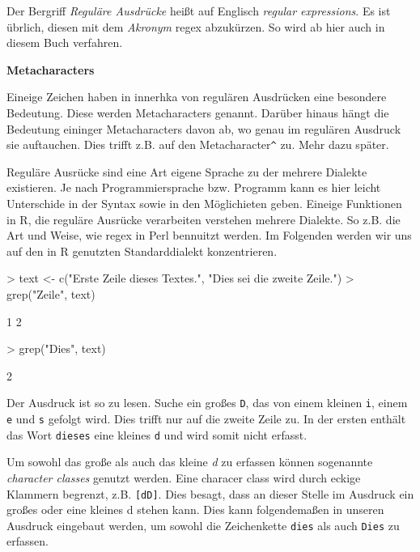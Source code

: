 \documentclass[a4paper]{report}
\newcommand{\R}{{\sffamily R}}
\begin{document}
Der Bergriff \emph{Reguläre Ausdrücke} heißt auf Englisch \emph{regular expressions}. Es ist übrlich, diesen mit dem \emph{Akronym} regex abzukürzen. So wird ab hier auch in diesem Buch verfahren.

\textbf{Metacharacters}

Eineige Zeichen haben in innerhka von regulären Ausdrücken eine besondere Bedeutung. Diese werden Metacharacters genannt. Darüber hinaus hängt die Bedeutung eininger Metacharacters davon ab, wo genau im regulären Ausdruck sie auftauchen. Dies trifft z.B. auf den Metacharacter\verb!^! zu. Mehr dazu später.

Reguläre Ausrücke sind eine Art eigene Sprache zu der mehrere Dialekte existieren. Je nach Programmiersprache bzw. Programm kann es hier leicht Unterschide in der Syntax sowie in den Möglichieten geben. Eineige Funktionen in \R{}, die reguläre Ausrücke verarbeiten verstehen mehrere Dialekte. So z.B. die Art und Weise, wie regex in Perl bennuitzt werden. Im Folgenden werden wir uns auf den in \R{} genutzten Standarddialekt konzentrieren. 

\begin{Schunk}
\begin{Sinput}
> text <- c("Erste Zeile dieses Textes.", 
           "Dies sei die zweite Zeile.")
> grep("Zeile", text)
\end{Sinput}
\begin{Soutput}
[1] 1 2
\end{Soutput}
\end{Schunk}

\begin{Schunk}
\begin{Sinput}
> grep("Dies", text)
\end{Sinput}
\begin{Soutput}
[1] 2
\end{Soutput}
\end{Schunk}

Der Ausdruck ist so zu lesen. Suche ein großes \texttt{D}, das von einem kleinen \texttt{i}, einem \texttt{e} und \texttt{s} gefolgt wird. Dies trifft nur auf die zweite Zeile zu. In der ersten enthält das Wort \texttt{dieses} eine kleines \texttt{d} und wird somit nicht erfasst.

Um sowohl das große als auch das kleine \emph{d} zu erfassen können sogenannte \emph{character classes} genutzt werden. Eine characer class wird durch eckige Klammern begrenzt, z.B. \texttt{[dD]}. Dies besagt, dass an dieser Stelle im Ausdruck ein großes oder eine kleines d stehen kann. Dies kann folgendemaßen in unseren Ausdruck eingebaut werden, um sowohl die Zeichenkette \texttt{dies} als auch \texttt{Dies} zu erfassen.
\end{document}

